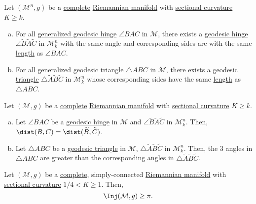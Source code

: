 \begin{lemma}
	Let \((\mathcal{M}^n , g)\) be a \hyperref[def:geodesically-complete]{complete} \hyperref[def:Riemannian-manifold]{Riemannian manifold} with \hyperref[def:sectional-curvature]{sectional curvature} \(K \geq k\).
	\begin{enumerate}[(a)]
		\item For all \hyperref[def:generalized-geodesic-hinge]{generalized geodesic hinge} \(\angle BAC\) in \(\mathcal{M} \), there exists a \hyperref[def:geodesic-hinge]{geodesic hinge} \(\angle \widetilde{B} \widetilde{A} \widetilde{C} \) in \(\mathcal{M} ^n_k\) with the same angle and corresponding sides are with the same \hyperref[def:length]{length} as \(\angle BAC\).
		\item For all \hyperref[def:generalized-geodesic-triangle]{generalized geodesic triangle} \(\triangle ABC\) in \(\mathcal{M} \), there exists a \hyperref[def:geodesic-triangle]{geodesic triangle} \(\triangle \widetilde{A} \widetilde{B} \widetilde{C} \) in \(\mathcal{M} ^n_k\) whose corresponding sides have the same \hyperref[def:length]{length} as \(\triangle ABC\).
	\end{enumerate}
\end{lemma}

\begin{theorem}\label{thm:Toponogor}
	Let \((\mathcal{M} , g)\) be a \hyperref[def:geodesically-complete]{complete} \hyperref[def:Riemannian-manifold]{Riemannian manifold} with \hyperref[def:sectional-curvature]{sectional curvature} \(K \geq k\).
	\begin{enumerate}[(a)]
		\item Let \(\angle BAC\) be a \hyperref[def:geodesic-hinge]{geodesic hinge} in \(\mathcal{M} \) and \(\angle \widetilde{B} \widetilde{A} \widetilde{C} \) in \(\mathcal{M} _k^n\). Then, \(\dist(B, C) = \dist(\widetilde{B} , \widetilde{C} ) \).
		\item Let \(\triangle ABC\) be a \hyperref[def:geodesic-triangle]{geodesic triangle} in \(\mathcal{M} \), \(\triangle \widetilde{A} \widetilde{B} \widetilde{C} \) in \(\mathcal{M} _k^n\). Then, the \(3\) angles in \(\triangle ABC\) are greater than the corresponding angles in \(\triangle \widetilde{A} \widetilde{B} \widetilde{C} \).
	\end{enumerate}
\end{theorem}

\begin{theorem}[Klingenberg]\label{thm:Klingenberg}
	Let \((\mathcal{M} , g)\) be a \hyperref[def:geodesically-complete]{complete}, simply-connected \hyperref[def:Riemannian-manifold]{Riemannian manifold} with \hyperref[def:sectional-curvature]{sectional curvature} \(1 / 4 < K \geq 1\). Then,
	\[
		\Inj(\mathcal{M} , g) \geq \pi .
	\]
\end{theorem}

